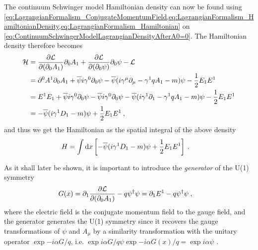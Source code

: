 \documentclass[../main.tex]{subfiles} %
\begin{document}
The continuum Schwinger model Hamiltonian density can now be found using \cref{eq:LagrangianFormalism_ConjugateMomentumField,eq:LagrangianFormalism_HamiltonianDensity,eq:LagrangianFormalism_Hamiltonian} on \cref{eq:ContinuumSchwingerModelLagrangianDensityAfterA0=0}. The Hamiltonian density therefore becomes
\begin{align} \label{eq:ContinuumSchwingerModelHamiltonianDensity}
\begin{split}
    \mathcal{H} &= \pdv{\mathcal{L}}{(\partial_0 A_1)} \partial_0 A_1 + \pdv{\mathcal{L}}{(\partial_0 \psi)} \partial_0 \psi - \mathcal{L} \\
        &= \partial^0 A^1 \partial_0 A_1 + \overline{\psi} i \gamma^0 \partial_0 \psi - \overline{\psi} (i \gamma^\mu \partial_\mu - \gamma^1 q A_1 - m) \psi - \frac{1}{2} E_1 E^1 \\
        &= E^1 E_1 + \overline{\psi} i \gamma^0 \partial_0 \psi - \overline{\psi} i \gamma^0 \partial_0 \psi - \overline{\psi} (i \gamma^1 \partial_1 - \gamma^1 q A_1 - m) \psi - \frac{1}{2} E_1 E^1 \\
        &= - \overline{\psi} (i \gamma^1 D_1 - m) \psi + \frac{1}{2} E_1 E^1 \: ,
\end{split}
\end{align}
and thus we get the Hamiltonian as the spatial integral of the above density
\begin{align} \label{eq:ContinuumSchwingerModelHamiltonian}
    H &= \int \dd{x} \left[ - \overline{\psi} (i \gamma^1 D_1 - m) \psi + \frac{1}{2} E_1 E^1 \right] \: .
\end{align}

As it shall later be shown, it is important to introduce the \emph{generator} of the U(1) symmetry
\begin{align} \label{eq:GeneratorU(1)SymmetryContinuum}
    G(x) &= \partial_1 \pdv{\L}{(\partial_0 A_1)} - q \psi\dagger \psi
        = \partial_1 E^1 - q \psi\dagger \psi \: ,
\end{align}
where the electric field is the conjugate momentum field to the gauge field, and the generator generates the U(1) symmetry since it recovers the gauge transformations of $\psi$ and $A_\mu$ by a similarity transformation with the unitary operator $\exp{-i\alpha G/q}$, i.e. $\exp{i\alpha G/q} \psi \exp{-i\alpha G(x)/q} = \exp{i\alpha}\psi$ \cite{panyella_masterThesis_2019}.
\end{document}
